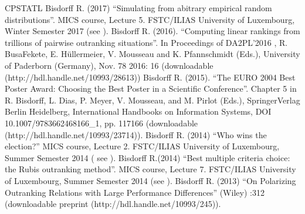 \documentclass[a4paper,12pt,english]{sphinxhowto}
\begin{document}
\begin{sphinxthebibliography}{CPSTAT\sphinxhyphen{}L}
Bisdorff R. (2017) “Simulating from abitrary empirical random distributions”. MICS  course, Lecture 5. FSTC/ILIAS University of Luxembourg, Winter Semester 2017 (see ).
Bisdorff R. (2016). “Computing linear rankings from trillions of pairwise outranking situations”. In Proceedings of DA2PL’2016 , R. Busa\sphinxhyphen{}Fekete, E. Hüllermeier, V. Mousseau and K. Pfannschmidt (Eds.), University of Paderborn (Germany), Nov. 7\sphinxhyphen{}8 2016: 1\sphinxhyphen{}6 (downloadable  (http://hdl.handle.net/10993/28613))
Bisdorff R. (2015). “The EURO 2004 Best Poster Award: Choosing the Best Poster in a Scientific Conference”. Chapter 5 in R. Bisdorff, L. Dias, P. Meyer, V. Mousseau, and M. Pirlot (Eds.),  Springer\sphinxhyphen{}Verlag Berlin Heidelberg, International Handbooks on Information Systems, DOI 10.1007/978\sphinxhyphen{}3\sphinxhyphen{}662\sphinxhyphen{}46816\sphinxhyphen{}6\_1, pp. 117\sphinxhyphen{}166 (downloadable  (http://hdl.handle.net/10993/23714)).
Bisdorff R. (2014)  “Who wins the election?” MICS  course, Lecture 2. FSTC/ILIAS University of Luxembourg, Summer Semester 2014 ( see ).
Bisdorff R.(2014)  “Best multiple criteria choice: the Rubis outranking method”. MICS  course, Lecture 7. FSTC/ILIAS University of Luxembourg, Summer Semester 2014 (see ).
Bisdorff R. (2013) “On Polarizing Outranking Relations with Large Performance Differences”  (Wiley) :3\sphinxhyphen{}12 (downloadable preprint  (http://hdl.handle.net/10993/245)).

\end{sphinxthebibliography}
\end{document}
